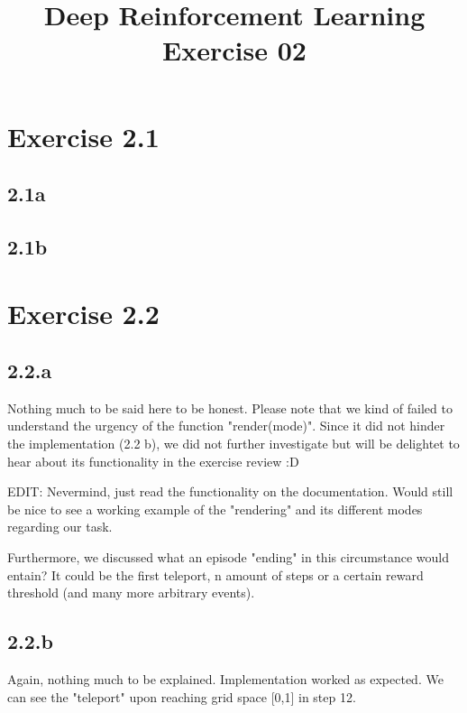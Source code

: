 \documentclass{article} %
\begin{document}
	
	\title{Deep Reinforcement Learning Exercise 02}
	\maketitle
	
	\section{Exercise 2.1}
	\subsection{2.1a}
	
	\subsection{2.1b}
	
	
	
	\section{Exercise 2.2}
	\subsection{2.2.a}
	Nothing much to be said here to be honest. Please note that we kind of failed to understand the urgency of the function "render(mode)". Since it did not hinder the implementation (2.2 b), we did not further investigate but will be delightet to hear about its functionality in the exercise review :D 
	
	EDIT: Nevermind, just read the functionality on the documentation. Would still be nice to see a working example of the "rendering" and its different modes regarding our task.
	
	Furthermore, we discussed what an episode "ending" in this circumstance would entain? It could be the first teleport, n amount of steps or a certain reward threshold (and many more arbitrary events).
	
	\subsection{2.2.b}
	Again, nothing much to be explained. Implementation worked as expected. We can see the "teleport" upon reaching grid space [0,1] in step 12. 
	
\end{document}
